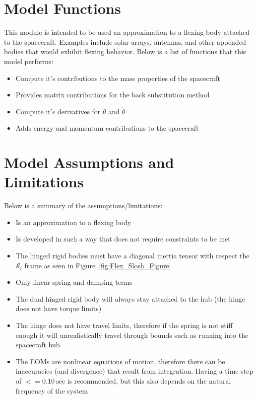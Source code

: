 \section{Model Functions}

This module is intended to be used an approximation to a flexing body attached to the spacecraft. Examples include solar arrays, antennas, and other appended bodies that would exhibit flexing behavior. Below is a list of functions that this model performs:

\begin{itemize}
	\item Compute it's contributions to the mass properties of the spacecraft
	\item Provides matrix contributions for the back substitution method
	\item Compute it's derivatives for $\theta$ and $\dot{\theta}$
	\item Adds energy and momentum contributions to the spacecraft
\end{itemize}

\section{Model Assumptions and Limitations}
Below is a summary of the assumptions/limitations:

\begin{itemize}
	\item Is an approximation to a flexing body
	\item Is developed in such a way that does not require constraints to be met
	\item The hinged rigid bodies must have a diagonal inertia tensor with respect the $\mathcal{S}_i$ frame as seen in Figure~\ref{fig:Flex_Slosh_Figure}
	\item Only linear spring and damping terms
	\item The dual hinged rigid body will always stay attached to the hub (the hinge does not have torque limits)
	\item The hinge does not have travel limits, therefore if the spring is not stiff enough it will unrealistically travel through bounds such as running into the spacecraft hub
	\item The EOMs are nonlinear equations of motion, therefore there can be inaccuracies (and divergence) that result from integration. Having a time step of $<= 0.10\ \text{sec}$ is recommended, but this also depends on the natural frequency of the system
\end{itemize}